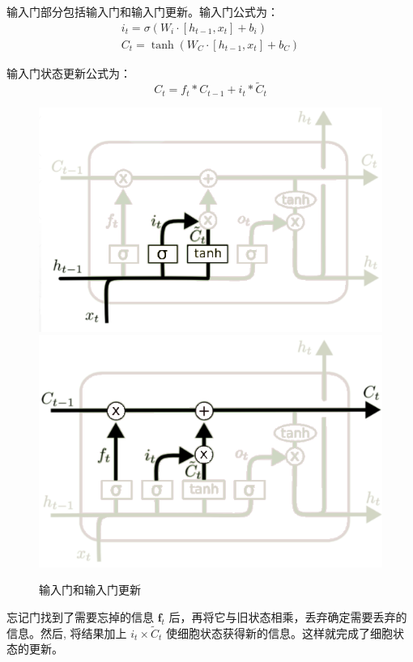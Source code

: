输入门部分包括输入门和输入门更新。输入门公式为：
\begin{align*}
	i_{t}=\sigma\left(W_{i} \cdot\left[h_{t-1}, x_{t}\right]+b_{i}\right) \\
	C_{t}=\tanh \left(W_{C} \cdot\left[h_{t-1}, x_{t}\right]+b_{C}\right)
\end{align*}

输入门状态更新公式为：$$C_{t}=f_{t} * C_{t-1}+i_{t} * \tilde{C}_{t}$$

\begin{figure}[h]
	\centering
	\includegraphics[scale=0.5,angle=0]{images/22.png}
	\includegraphics[scale=0.5,angle=0]{images/24.png}
	\caption{输入门和输入门更新}
	\label{21}
\end{figure}

忘记门找到了需要忘掉的信息 $ \boldsymbol{f}_{t} $ 后，再将它与旧状态相乘，丢弃确定需要丢弃的信息。然后, 将结果加上 $ i_{t} \times \tilde{C}_{t} $ 使细胞状态获得新的信息。这样就完成了细胞状态的更新。


